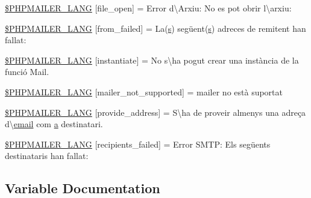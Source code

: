 \begin{DoxyCompactItemize}
\item 
\hyperlink{phpmailer_8lang-ca_8php_a28d1a6517bf4c942a0ddd506188ad2e0}{\$\+P\+H\+P\+M\+A\+I\+L\+E\+R\+\_\+\+L\+A\+NG} \mbox{[}\textquotesingle{}file\+\_\+open\textquotesingle{}\mbox{]} = \textquotesingle{}Error d\textbackslash{}\textquotesingle{}Arxiu\+: No es pot obrir l\textbackslash{}\textquotesingle{}arxiu\+: \textquotesingle{}
\item 
\hyperlink{phpmailer_8lang-ca_8php_adf832ae12155a09be077c6d5e4fd7e22}{\$\+P\+H\+P\+M\+A\+I\+L\+E\+R\+\_\+\+L\+A\+NG} \mbox{[}\textquotesingle{}from\+\_\+failed\textquotesingle{}\mbox{]} = \textquotesingle{}La(\hyperlink{paste_2plugin_8min_8js_a43ae144ee2a4e493fea41ca42f795b14}{s}) següent(\hyperlink{paste_2plugin_8min_8js_a43ae144ee2a4e493fea41ca42f795b14}{s}) adreces de remitent han fallat\+: \textquotesingle{}
\item 
\hyperlink{phpmailer_8lang-ca_8php_ad58dde16780f4770ccf4dd282ea1f5ad}{\$\+P\+H\+P\+M\+A\+I\+L\+E\+R\+\_\+\+L\+A\+NG} \mbox{[}\textquotesingle{}instantiate\textquotesingle{}\mbox{]} = \textquotesingle{}No s\textbackslash{}\textquotesingle{}ha pogut crear una instància de la funció Mail.\textquotesingle{}
\item 
\hyperlink{phpmailer_8lang-ca_8php_aa2ebcb8833ee83a7ad67401c4bb3a6ad}{\$\+P\+H\+P\+M\+A\+I\+L\+E\+R\+\_\+\+L\+A\+NG} \mbox{[}\textquotesingle{}mailer\+\_\+not\+\_\+supported\textquotesingle{}\mbox{]} = \textquotesingle{} mailer no està suportat\textquotesingle{}
\item 
\hyperlink{phpmailer_8lang-ca_8php_a8b97897c2406b7392b056f375feeefbb}{\$\+P\+H\+P\+M\+A\+I\+L\+E\+R\+\_\+\+L\+A\+NG} \mbox{[}\textquotesingle{}provide\+\_\+address\textquotesingle{}\mbox{]} = \textquotesingle{}S\textbackslash{}\textquotesingle{}ha de proveir almenys una adreça d\textbackslash{}\textquotesingle{}\hyperlink{actions_2account_8php_a011c66ae212438e0d7de7c0e40451bb3}{email} com \hyperlink{_chart_8min_8js_aef3b685c08bc6c76c8e729bd0e93901d}{a} destinatari.\textquotesingle{}
\item 
\hyperlink{phpmailer_8lang-ca_8php_a7589d30bb9b368327c2df015f3e6bcba}{\$\+P\+H\+P\+M\+A\+I\+L\+E\+R\+\_\+\+L\+A\+NG} \mbox{[}\textquotesingle{}recipients\+\_\+failed\textquotesingle{}\mbox{]} = \textquotesingle{}Error S\+M\+T\+P\+: Els següents destinataris han fallat\+: \textquotesingle{}
\end{DoxyCompactItemize}


\subsection{Variable Documentation}
